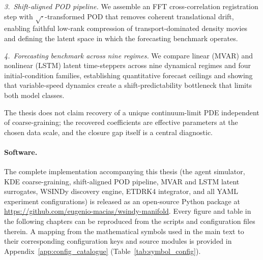 \emph{3.\ Shift-aligned POD pipeline.}
We assemble an FFT cross-correlation registration step with $\sqrt{\cdot}$-transformed POD that removes coherent translational drift, enabling faithful low-rank compression of transport-dominated density movies and defining the latent space in which the forecasting benchmark operates.

\emph{4.\ Forecasting benchmark across nine regimes.}
We compare linear (MVAR) and nonlinear (LSTM) latent time-steppers across nine dynamical regimes and four initial-condition families, establishing quantitative forecast ceilings and showing that variable-speed dynamics create a shift-predictability bottleneck that limits both model classes.

\noindent
The thesis does not claim recovery of a unique continuum-limit
PDE independent of coarse-graining; the recovered coefficients are effective
parameters at the chosen data scale, and the closure gap itself is a
central diagnostic.

\paragraph{Software.}The complete implementation accompanying this thesis (the agent simulator, KDE coarse-graining, shift-aligned POD pipeline, MVAR and LSTM latent surrogates, WSINDy discovery engine, ETDRK4 integrator, and all YAML experiment configurations) is released as an open-source Python package at \url{https://github.com/eugenio-macias/wsindy-manifold}. Every figure and table in the following chapters can be reproduced from the scripts and configuration files therein.
A mapping from the mathematical symbols used in the main text to their
corresponding configuration keys and source modules is provided in
Appendix~\ref{app:config_catalogue} (Table~\ref{tab:symbol_config}).

